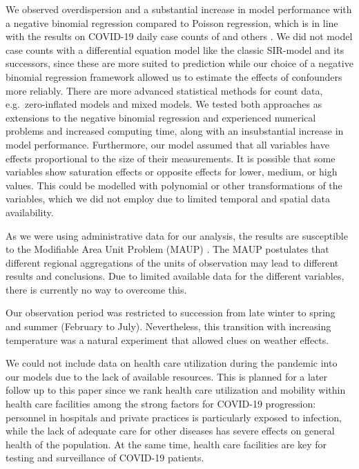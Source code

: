 \documentclass[]{elsarticle} %
\begin{document}
We observed overdispersion and a substantial increase in model
performance with a negative binomial regression compared to Poisson
regression, which is in line with the results on COVID-19 daily case
counts of \citet{kraemer_effect_2020} and others
\citep{liu_impact_2020, bannister-tyrrell_preliminary_2020}. We did not
model case counts with a differential equation model like the classic
SIR-model \citep{kermack1991contributions} and its successors, since
these are more suited to prediction \citep[e.g.][]{rkimodellierung}
while our choice of a negative binomial regression framework allowed us
to estimate the effects of confounders more reliably. There are more
advanced statistical methods for count data, e.g.~zero-inflated models
and mixed models. We tested both approaches as extensions to the
negative binomial regression and experienced numerical problems and
increased computing time, along with an insubstantial increase in model
performance. Furthermore, our model assumed that all variables have
effects proportional to the size of their measurements. It is possible
that some variables show saturation effects or opposite effects for
lower, medium, or high values. This could be modelled with polynomial or
other transformations of the variables, which we did not employ due to
limited temporal and spatial data availability.

As we were using administrative data for our analysis, the results are
susceptible to the Modifiable Area Unit Problem (MAUP)
\citep{Openshaw1984}. The MAUP postulates that different regional
aggregations of the units of observation may lead to different results
and conclusions. Due to limited available data for the different
variables, there is currently no way to overcome this.

Our observation period was restricted to succession from late winter to
spring and summer (February to July). Nevertheless, this transition with
increasing temperature was a natural experiment that allowed clues on
weather effects.

We could not include data on health care utilization during the pandemic
into our models due to the lack of available resources. This is planned
for a later follow up to this paper since we rank health care
utilization and mobility within health care facilities among the strong
factors for COVID-19 progression: personnel in hospitals and private
practices is particularly exposed to infection, while the lack of
adequate care for other diseases has severe effects on general health of
the population. At the same time, health care facilities are key for
testing and surveillance of COVID-19 patients.
\end{document}
